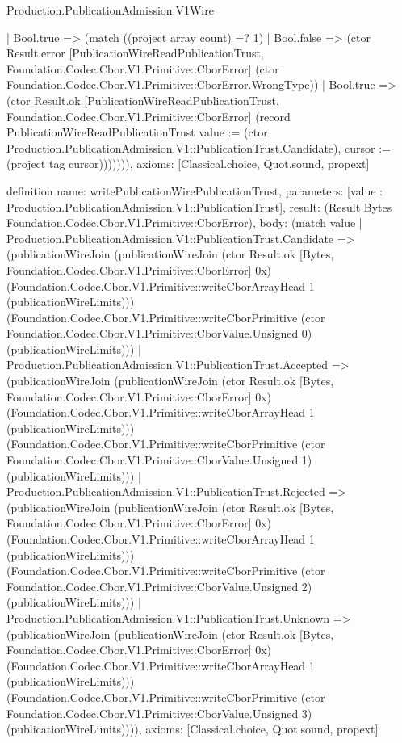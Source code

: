 \begin{lexlean}{Production.PublicationAdmission.V1Wire}
\begin{semanticmodule}
{        | Bool.true => (match ((project array count) =? 1)
          | Bool.false => (ctor Result.error [PublicationWireReadPublicationTrust, Foundation.Codec.Cbor.V1.Primitive::CborError] (ctor Foundation.Codec.Cbor.V1.Primitive::CborError.WrongType))
          | Bool.true => (ctor Result.ok [PublicationWireReadPublicationTrust, Foundation.Codec.Cbor.V1.Primitive::CborError] (record PublicationWireReadPublicationTrust {value := (ctor Production.PublicationAdmission.V1::PublicationTrust.Candidate), cursor := (project tag cursor)})))))),
  axioms: [Classical.choice, Quot.sound, propext]
}

definition{
  name: writePublicationWirePublicationTrust,
  parameters: [value : Production.PublicationAdmission.V1::PublicationTrust],
  result: (Result Bytes Foundation.Codec.Cbor.V1.Primitive::CborError),
  body: (match value
    | Production.PublicationAdmission.V1::PublicationTrust.Candidate => (publicationWireJoin (publicationWireJoin (ctor Result.ok [Bytes, Foundation.Codec.Cbor.V1.Primitive::CborError] 0x) (Foundation.Codec.Cbor.V1.Primitive::writeCborArrayHead 1 (publicationWireLimits))) (Foundation.Codec.Cbor.V1.Primitive::writeCborPrimitive (ctor Foundation.Codec.Cbor.V1.Primitive::CborValue.Unsigned 0) (publicationWireLimits)))
    | Production.PublicationAdmission.V1::PublicationTrust.Accepted => (publicationWireJoin (publicationWireJoin (ctor Result.ok [Bytes, Foundation.Codec.Cbor.V1.Primitive::CborError] 0x) (Foundation.Codec.Cbor.V1.Primitive::writeCborArrayHead 1 (publicationWireLimits))) (Foundation.Codec.Cbor.V1.Primitive::writeCborPrimitive (ctor Foundation.Codec.Cbor.V1.Primitive::CborValue.Unsigned 1) (publicationWireLimits)))
    | Production.PublicationAdmission.V1::PublicationTrust.Rejected => (publicationWireJoin (publicationWireJoin (ctor Result.ok [Bytes, Foundation.Codec.Cbor.V1.Primitive::CborError] 0x) (Foundation.Codec.Cbor.V1.Primitive::writeCborArrayHead 1 (publicationWireLimits))) (Foundation.Codec.Cbor.V1.Primitive::writeCborPrimitive (ctor Foundation.Codec.Cbor.V1.Primitive::CborValue.Unsigned 2) (publicationWireLimits)))
    | Production.PublicationAdmission.V1::PublicationTrust.Unknown => (publicationWireJoin (publicationWireJoin (ctor Result.ok [Bytes, Foundation.Codec.Cbor.V1.Primitive::CborError] 0x) (Foundation.Codec.Cbor.V1.Primitive::writeCborArrayHead 1 (publicationWireLimits))) (Foundation.Codec.Cbor.V1.Primitive::writeCborPrimitive (ctor Foundation.Codec.Cbor.V1.Primitive::CborValue.Unsigned 3) (publicationWireLimits)))),
  axioms: [Classical.choice, Quot.sound, propext]
}


\end{semanticmodule}
\end{lexlean}
